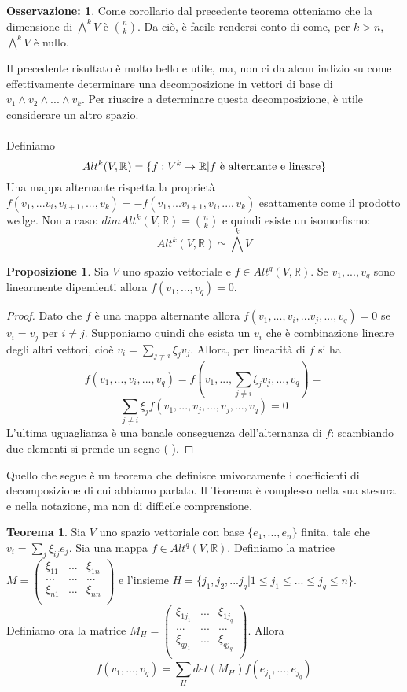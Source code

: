 \documentclass[12pt,a4paper]{report}
\theoremstyle{definition}
\theoremstyle{Theorem}
\newtheorem{Theo}[Def]{Teorema}
\newtheorem{Prop}[Def]{Proposizione}
\theoremstyle{definition}
\theoremstyle{definition}
\theoremstyle{definition}
\newtheorem{Obs}[Def]{Osservazione:}
\begin{document}
	\begin{Obs}
		Come corollario dal precedente teorema otteniamo che la dimensione di $\bigwedge^k V$ è ${n\choose k}$. Da ciò, è facile rendersi conto di come, per $k> n$, $\bigwedge^k V$ è nullo.	
		\end{Obs}
	Il precedente risultato è molto bello e utile, ma, non ci da alcun indizio su come effettivamente determinare una decomposizione in vettori di base di $v_1\wedge v_2\wedge...\wedge v_k$. Per riuscire a determinare questa decomposizione, è utile considerare un altro spazio.\\
	\\
	Definiamo 
	$$Alt^k(V,\mathbb{R})=\{f:V^k\rightarrow \mathbb{R}| f \hbox{ è alternante e lineare}\}$$
	Una mappa alternante rispetta la proprietà $f(v_1,...v_i,v_{i+1},...,v_k)=-f(v_1,...v_{i+1},v_{i},...,v_k)$ esattamente come il prodotto wedge. Non a caso: $dim Alt^k(V,\mathbb{R})={n\choose k}$ e quindi esiste un isomorfismo:
	$$Alt^k(V,\mathbb{R})\simeq \bigwedge^k V$$
	\begin{Prop}
		Sia $V$ uno spazio vettoriale e $f\in Alt^q(V,\mathbb{R})$. Se $v_1,...,v_q$ sono linearmente dipendenti allora $f(v_1,...,v_q)=0.$
	\end{Prop}
	\begin{proof}
		Dato che $f$ è una mappa alternante allora $f(v_1,...,v_i,...v_j,...,v_q)=0$ se $v_i=v_j$ per $i\neq j$. Supponiamo quindi che esista un $v_i$ che è combinazione lineare degli altri vettori, cioè $v_i=\sum_{j\neq i}\xi_jv_j$. Allora, per linearità di $f$ si ha
		$$f(v_1,...,v_i,...,v_q)=f(v_1,...,\sum_{j\neq i}\xi_jv_j,...,v_q)=$$
		$$\sum_{j\neq i}\xi_jf(v_1,...,v_j,...,v_j,...,v_q)=0$$
		L'ultima uguaglianza è una banale conseguenza dell'alternanza di $f$: scambiando due elementi si prende un segno (-).
	\end{proof}
	Quello che segue è un teorema che definisce univocamente i coefficienti di decomposizione di cui abbiamo parlato. Il Teorema è complesso nella sua stesura e nella notazione, ma non di difficile comprensione.
	\begin{Theo}\label{Theo 2}
		Sia $V$ uno spazio vettoriale con base $\{e_1,...,e_n\}$ finita, tale che $v_i=\sum_{j}\xi_{ij}e_j$. Sia una mappa $f\in Alt^q(V,\mathbb{R})$. Definiamo la matrice 
		$M=\begin{pmatrix}
			\xi_{11} &...& \xi_{1n}\\
			... &...& ...\\
			\xi_{n1} &...& \xi_{nn}\\
		\end{pmatrix}$ e l'insieme $H=\{j_1,j_2,...j_q|1\leq j_1\le...\le j_q\leq n\}$. Definiamo ora la matrice 
		$M_H=\begin{pmatrix}
			\xi_{1j_1} &...& \xi_{1j_q}\\
			... &...& ...\\
			\xi_{qj_1} &...& \xi_{qj_q}\\
		\end{pmatrix}$. Allora 
		$$f(v_1,...,v_q)=\sum_{H}det(M_H)f(e_{j_1},...,e_{j_q})$$
	\end{Theo}
\end{document}
